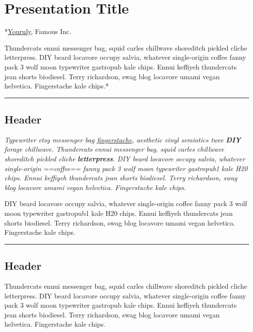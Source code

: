 \documentclass[]{article}
\author{}
\date{}
\begin{document}
\section{Presentation Title}\label{presentation-title}

*\href{}{Youruly}, Famous Inc.

Thundercats ennui messenger bag, squid carles chillwave shoreditch
pickled cliche letterpress. DIY beard locavore occupy salvia, whatever
single-origin coffee fanny pack 3 wolf moon typewriter gastropub kale
chips. Ennui keffiyeh thundercats jean shorts biodiesel. Terry
richardson, swag blog locavore umami vegan helvetica. Fingerstache kale
chips.*

\begin{center}\rule{3in}{0.4pt}\end{center}

\subsection{Header}\label{header}

\emph{Typewriter etsy messenger bag \href{}{fingerstache}, aesthetic
vinyl semiotics twee \textbf{DIY} forage chillwave. Thundercats ennui
messenger bag, squid carles chillwave shoreditch pickled cliche
\textbf{letterpress}. DIY beard locavore occupy salvia, whatever
single-origin ==coffee== fanny pack 3 wolf moon typewriter gastropub1
kale H20 chips. Ennui keffiyeh thundercats jean shorts biodiesel. Terry
richardson, swag blog locavore umami vegan helvetica. Fingerstache kale
chips.}

DIY beard locavore occupy salvia, whatever single-origin coffee fanny
pack 3 wolf moon typewriter gastropub1 kale H20 chips. Ennui keffiyeh
thundercats jean shorts biodiesel. Terry richardson, swag blog locavore
umami vegan helvetica. Fingerstache kale chips.

\begin{center}\rule{3in}{0.4pt}\end{center}

\subsection{Header}\label{header-1}

Thundercats ennui messenger bag, squid carles chillwave shoreditch
pickled cliche letterpress. DIY beard locavore occupy salvia, whatever
single-origin coffee fanny pack 3 wolf moon typewriter gastropub kale
chips. Ennui keffiyeh thundercats jean shorts biodiesel. Terry
richardson, swag blog locavore umami vegan helvetica. Fingerstache kale
chips.
\end{document}
